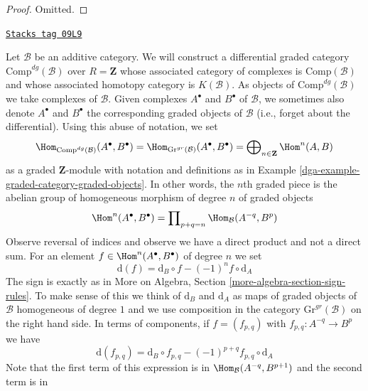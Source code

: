 \begin{proof}
Omitted.
\end{proof}

\begin{example}

\label{dga-example-category-complexes}
\href{https://stacks.math.columbia.edu/tag/09L9}{\texttt{Stacks tag 09L9}}

Let $\mathcal{B}$ be an additive category. We will construct
a differential graded category $\text{Comp}^{dg}(\mathcal{B})$
over $R = \mathbf{Z}$ whose associated category of complexes
is $\text{Comp}(\mathcal{B})$ and whose associated homotopy
category is $K(\mathcal{B})$. As objects of $\text{Comp}^{dg}(\mathcal{B})$
we take complexes of $\mathcal{B}$. Given complexes
$A^\bullet$ and $B^\bullet$ of $\mathcal{B}$, we sometimes also
denote $A^\bullet$ and $B^\bullet$ the corresponding graded objects
of $\mathcal{B}$ (i.e., forget about the differential).
Using this abuse of notation, we set
$$
\Hom_{\text{Comp}^{dg}(\mathcal{B})}(A^\bullet, B^\bullet) =
\Hom_{\text{Gr}^{gr}(\mathcal{B})}(A^\bullet, B^\bullet) =
\bigoplus\nolimits_{n \in \mathbf{Z}} \Hom^n(A, B)
$$
as a graded $\mathbf{Z}$-module with notation and definitions as
in Example \ref{dga-example-graded-category-graded-objects}.
In other words, the $n$th graded piece is
the abelian group of homogeneous morphism of degree $n$ of graded objects
$$
\Hom^n(A^\bullet, B^\bullet) =
\prod\nolimits_{p + q = n} \Hom_\mathcal{B}(A^{-q}, B^p)
$$
Observe reversal of indices and observe we have a direct product
and not a direct sum. For an element
$f \in \Hom^n(A^\bullet, B^\bullet)$ of degree $n$ we set
$$
\text{d}(f) = \text{d}_B \circ f - (-1)^n f \circ \text{d}_A
$$
The sign is exactly as in
More on Algebra, Section \ref{more-algebra-section-sign-rules}.
To make sense of this we think of $\text{d}_B$ and $\text{d}_A$
as maps of graded objects of $\mathcal{B}$ homogeneous of degree $1$
and we use composition in the category $\text{Gr}^{gr}(\mathcal{B})$
on the right hand side. In terms of components, if $f = (f_{p, q})$ with
$f_{p, q} : A^{-q} \to B^p$ we have
\begin{equation}
\label{equation-differential-hom-complex}
\text{d}(f_{p, q}) =
\text{d}_B \circ f_{p, q} - (-1)^{p + q} f_{p, q} \circ \text{d}_A
\end{equation}
Note that the first term of this expression is in
$\Hom_\mathcal{B}(A^{-q}, B^{p + 1})$ and the second term is in

\end{example}
